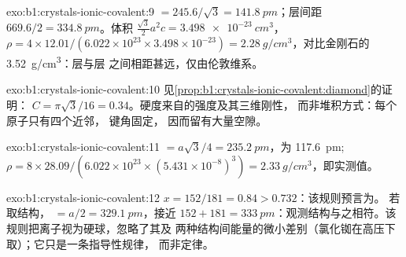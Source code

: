 \begin{solution}{exo:b1:crystals-ionic-covalent:9}
 $= 245.6/\sqrt3 = \qty{141.8}{pm}$；层间距 $669.6/2 =
\qty{334.8}{pm}$。体积 $\frac{\sqrt3}{2}a^2c = \qty{3.498e-23}{cm^3}$，
$\rho = 4 \times 12.01/(6.022 \times 10^{23} \times 3.498 \times 10^{-23})
= \qty{2.28}{g/cm^3}$，对比金刚石的 \qty{3.52}{g/cm^3}：层与层
之间相距甚远，仅由伦敦维系。
\end{solution}

\begin{solution}{exo:b1:crystals-ionic-covalent:10}
见\cref{prop:b1:crystals-ionic-covalent:diamond}的证明：
$C = \pi\sqrt3/16 = 0.34$。硬度来自的强度及其三维刚性，
而非堆积方式：每个原子只有四个近邻，
键角固定，
因而留有大量空隙。
\end{solution}

\begin{solution}{exo:b1:crystals-ionic-covalent:11}
 $= a\sqrt3/4 = \qty{235.2}{pm}$，为
\qty{117.6}{pm}; $\rho = 8 \times 28.09/(6.022 \times 10^{23} \times
(5.431 \times 10^{-8})^3) = \qty{2.33}{g/cm^3}$，即实测值。
\end{solution}

\begin{solution}{exo:b1:crystals-ionic-covalent:12}
$x = 152/181 = 0.84 > 0.732$：该规则预言为。
若取结构， $= a/2 = \qty{329.1}{pm}$，接近
$152 + 181 = \qty{333}{pm}$：观测结构与之相符。该
规则把离子视为硬球，忽略了其及
两种结构间能量的微小差别（氯化铷在高压下
取）；它只是一条指导性规律，
而非定律。
\end{solution}

